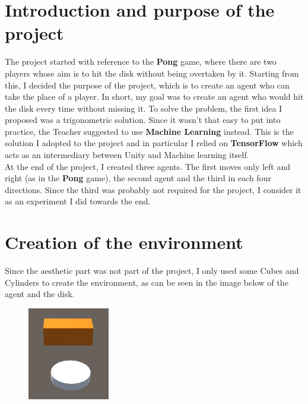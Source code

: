 \documentclass[12pt]{article}
\begin{document}
\begin{titlepage}
		
		\vfill 
		
	\end{titlepage}

	\tableofcontents
	
	\newpage
	
	\section{Introduction and purpose of the project}
	The project started with reference to the \textbf{Pong} game, where there are two players whose aim is to hit the disk without being overtaken by it. Starting from this, I decided the purpose of the project, which is to create an agent who can take the place of a player. In short, my goal was to create an agent who would hit the disk every time without missing it.
	To solve the problem, the first idea I proposed was a trigonometric solution. Since it wasn't that easy to put into practice, the Teacher suggested to use \textbf{Machine Learning} instead. This is the solution I adopted to the project and in particular I relied on \textbf{TensorFlow} which acts as an intermediary between Unity and Machine learning itself.\\
	At the end of the project, I created three agents. The first moves only left and right (as in the \textbf{Pong} game), the second agent and the third in each four directions. Since the third was probably not required for the project, I consider it as an experiment I did towards the end.
	
	\newpage
	
	\section{Creation of the environment}
	Since the aesthetic part was not part of the project, I only used some Cubes and Cylinders to create the environment, as can be seen in the image below of the agent and the disk.
	
	\begin{figure}[hbt!]
		\centering
		\includegraphics[width= 0.3
		\textwidth]{images/Disk&Agent}
	\end{figure} 
\end{document}
